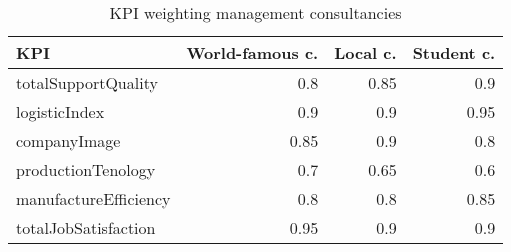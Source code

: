 \begin{table}[!hp]
\centering
\begin{tabular}{|l|r|r|r|}
\hline
KPI                     & World-famous c.   & Local c.   & Student c.\\ \hline
totalSupportQuality     & 0.8               & 0.85       & 0.9       \\
logisticIndex           & 0.9               & 0.9        & 0.95      \\
companyImage            & 0.85              & 0.9        & 0.8       \\
productionTenology      & 0.7               & 0.65       & 0.6       \\
manufactureEfficiency   & 0.8               & 0.8        & 0.85      \\
totalJobSatisfaction    & 0.95              & 0.9        & 0.9       \\
\hline
\end{tabular}
\caption{KPI weighting management consultancies}
\label{mngc_weighting}
\end{table}


